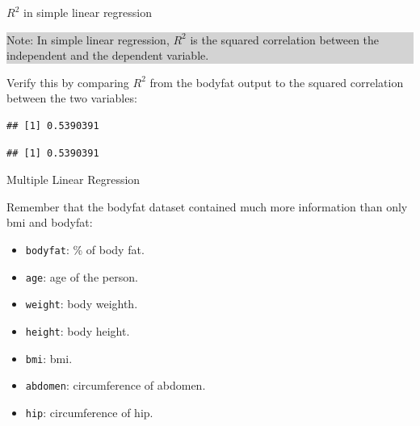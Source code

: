 \documentclass[10pt,ignorenonframetext,]{beamer}
\newenvironment{Shaded}{\begin{snugshade}}{\end{snugshade}}
\newcommand{\KeywordTok}[1]{\textcolor[rgb]{0.13,0.29,0.53}{\textbf{#1}}}
\newcommand{\DecValTok}[1]{\textcolor[rgb]{0.00,0.00,0.81}{#1}}
\newcommand{\OperatorTok}[1]{\textcolor[rgb]{0.81,0.36,0.00}{\textbf{#1}}}
\newcommand{\NormalTok}[1]{#1}
\providecommand{\tightlist}{%
  \setlength{\itemsep}{0pt}\setlength{\parskip}{0pt}}
\begin{document}
\begin{frame}[fragile]

\begin{block}{\(R^2\) in simple linear regression}

\vspace{3mm}

\colorbox{lightgray}{\begin{minipage}{10cm}
Note: In simple linear regression, $R^2$ is the squared correlation between the independent and the dependent variable.
\end{minipage}}

\vspace{6mm}

Verify this by comparing \(R^2\) from the bodyfat output to the squared
correlation between the two variables:

\scriptsize

\begin{Shaded}
\end{Shaded}

\begin{verbatim}
## [1] 0.5390391
\end{verbatim}

\begin{Shaded}
\end{Shaded}

\begin{verbatim}
## [1] 0.5390391
\end{verbatim}

\end{block}

\end{frame}

\begin{frame}[fragile]{Multiple Linear Regression}

Remember that the bodyfat dataset contained much more information than
only bmi and bodyfat:

\begin{itemize}
\tightlist
\item
  \texttt{bodyfat}: \% of body fat.
\item
  \texttt{age}: age of the person.
\item
  \texttt{weight}: body weighth.
\item
  \texttt{height}: body height.
\item
  \texttt{bmi}: bmi.
\item
  \texttt{abdomen}: circumference of abdomen.
\item
  \texttt{hip}: circumference of hip.
\end{itemize}

\end{frame}
\end{document}
